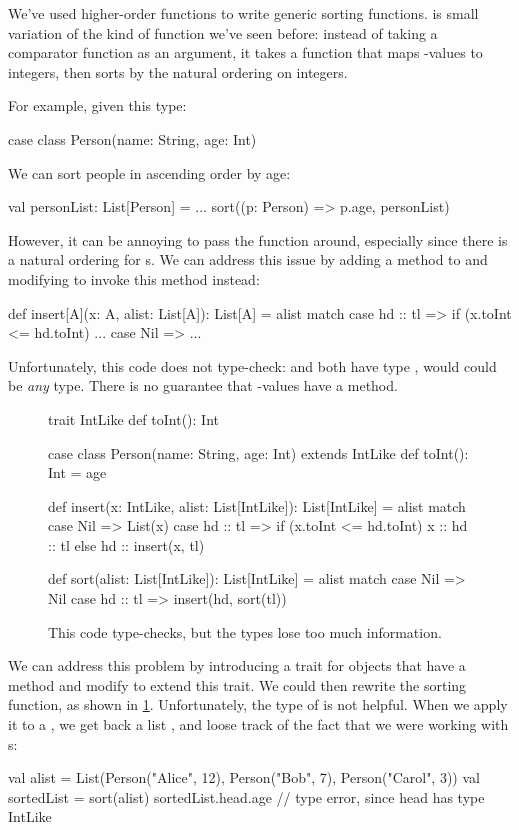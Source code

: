 \documentclass{book}
\begin{document}
We've used higher-order functions to write generic sorting functions.
 is small variation of the kind of function we've
seen before: instead of taking a comparator function as an argument, it takes a
 function that maps
-values to integers, then sorts by the natural ordering
on integers.

For example, given this type:
\begin{scalacode}
case class Person(name: String, age: Int)
\end{scalacode}
We can sort people in ascending order by age:
\begin{scalacode}
val personList: List[Person] = ...
sort((p: Person) => p.age, personList)
\end{scalacode}

However, it can be annoying to pass the  function around,
especially since there is a natural ordering for s.
We can address this issue by adding a  method
to  and modifying  to invoke this
method instead:
\begin{scalacode}
def insert[A](x: A, alist: List[A]): List[A] = alist match {
  case hd :: tl => if (x.toInt <= hd.toInt) ...
  case Nil => ...
}
\end{scalacode}
Unfortunately, this code does not type-check:  and  both have type ,
would could be \emph{any} type. There is no guarantee that -values have a 
method.

\begin{figure}
\begin{scalacode}
trait IntLike {
  def toInt(): Int
}

case class Person(name: String, age: Int) extends IntLike {
  def toInt(): Int = age
}

def insert(x: IntLike, alist: List[IntLike]): List[IntLike] = alist match {
  case Nil => List(x)
  case hd :: tl => if (x.toInt <= hd.toInt) { x :: hd :: tl } else { hd :: insert(x, tl) }
}

def sort(alist: List[IntLike]): List[IntLike] = alist match {
  case Nil => Nil
  case hd :: tl => insert(hd, sort(tl))
}
\end{scalacode}
\caption{This code type-checks, but the types lose too much information.}
\label{sorting_fail}
\end{figure}

We can address this problem by introducing a trait for objects that have a
 method and modify  to extend this trait.
We could then rewrite the sorting function, as shown in \cref{sorting_fail}.
Unfortunately, the type of  is not helpful. When we apply
it to a , we get back a list ,
and loose track of the fact that we were working with s:
\begin{scalacode}
val alist = List(Person("Alice", 12), Person("Bob", 7), Person("Carol", 3))
val sortedList = sort(alist)
sortedList.head.age // type error, since head has type IntLike
\end{scalacode}
\end{document}
